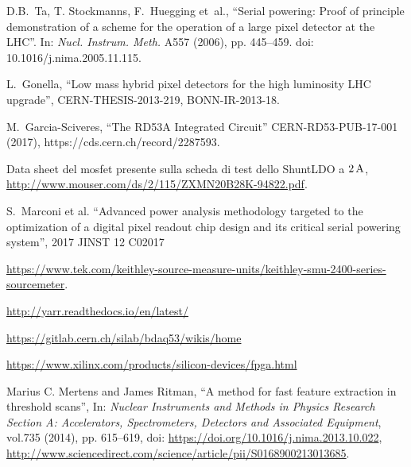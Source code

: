 \begin{thebibliography}{1}
 D.B.~Ta, T. Stockmanns, F.~Huegging et~al., ``Serial powering: Proof of principle demonstration of a scheme for the operation of a large pixel detector at the LHC''. In: \textit{Nucl. Instrum. Meth.} A557 (2006), pp. 445--459. doi: 10.1016/j.nima.2005.11.115.

 L.~Gonella, ``Low mass hybrid pixel detectors for the high luminosity LHC upgrade'', CERN-THESIS-2013-219, BONN-IR-2013-18.

 M.~Garcia-Sciveres, ``The RD53A Integrated Circuit''
  CERN-RD53-PUB-17-001 (2017), https://cds.cern.ch/record/2287593.

 Data sheet del mosfet presente sulla scheda di test dello ShuntLDO a $2\rm \, A$,  
  \url{http://www.mouser.com/ds/2/115/ZXMN20B28K-94822.pdf}.

 S.~Marconi et al. ``Advanced power analysis methodology targeted to the optimization of a digital pixel readout chip design and its critical serial powering system'', 2017 JINST 12 C02017

 \url{https://www.tek.com/keithley-source-measure-units/keithley-smu-2400-series-sourcemeter}.

 \url{http://yarr.readthedocs.io/en/latest/}

 \url{https://gitlab.cern.ch/silab/bdaq53/wikis/home}

 \url{https://www.xilinx.com/products/silicon-devices/fpga.html}

 Marius C. Mertens and James Ritman, ``A method for fast feature extraction in threshold scans'', 
In: \textit{Nuclear Instruments and Methods in Physics Research Section A: Accelerators, Spectrometers, Detectors and Associated Equipment}, 
vol.735 (2014), pp. 615--619, doi: \url{https://doi.org/10.1016/j.nima.2013.10.022}, 
	\url{http://www.sciencedirect.com/science/article/pii/S0168900213013685}.

\end{thebibliography}